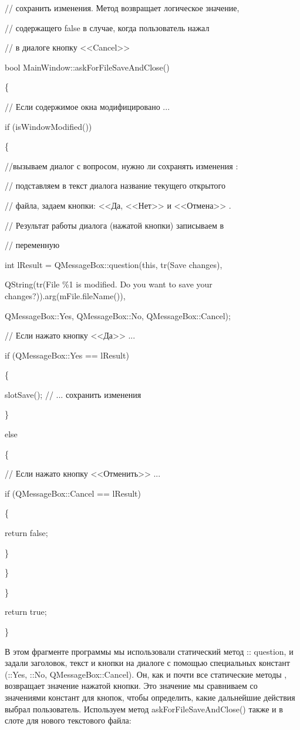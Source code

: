 // сохранить изменения. Метод возвращает логическое значение, 

// содержащего false в случае, когда пользователь нажал 

// в диалоге кнопку <<Cancel>> 

bool MainWindow::askForFileSaveAndClose()

\{

// Если содержимое окна модифицировано ...

if (isWindowModified())

\{

//вызываем диалог с вопросом, нужно ли сохранять изменения :

// подставляем в текст диалога название текущего открытого

// файла, задаем кнопки: <<Да, <<Нет>> и <<Отмена>> .

// Результат работы диалога (нажатой кнопки) записываем в

// переменную 

int lResult = QMessageBox::question(this, tr(Save changes),

QString(tr(File \%1 is modified. Do you want to save your changes?)).arg(mFile.fileName()),

 QMessageBox::Yes, QMessageBox::No, QMessageBox::Cancel);

// Если нажато кнопку <<Да>> ... 

if (QMessageBox::Yes == lResult)

\{

 slotSave(); // ... сохранить изменения 

\}

else

\{

// Если нажато кнопку <<Отменить>> ...

if (QMessageBox::Cancel == lResult)

\{

 return false;

\}

\}

\}

return true;

\}

В этом фрагменте программы мы использовали статический метод  :: question, и задали
заголовок, текст и кнопки на диалоге с помощью специальных констант (::Yes, ::No,
QMessageBox::Cancel). Он, как и почти все статические методы , возвращает значение нажатой кнопки. Это
значение мы сравниваем со значениями констант для кнопок, чтобы определить, какие дальнейшие действия выбрал
пользователь. Используем метод askForFileSaveAndClose() также и в слоте для нового текстового файла: 

